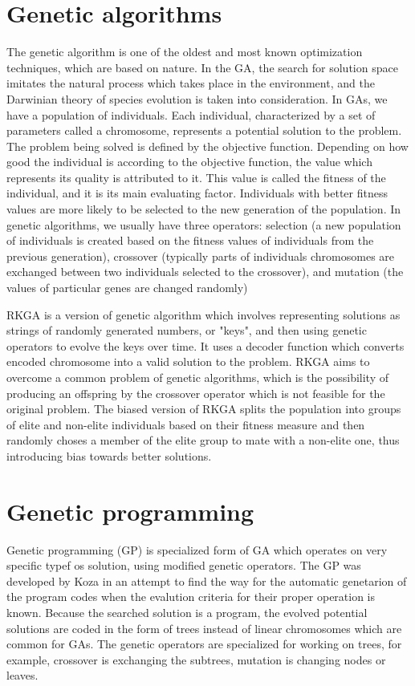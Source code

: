 \documentclass[oneside]{ctuthesis}
\theoremstyle{plain}
\theoremstyle{definition}
\theoremstyle{note}
\begin{document}
\section{Genetic algorithms}
The genetic algorithm is one of the oldest and most known optimization techniques, which are based on nature. In the GA, the search for solution space imitates the natural process which takes place in the environment, and the Darwinian theory of species evolution is taken into consideration. In GAs, we have a population of individuals. Each individual, characterized by a set of parameters called a chromosome, represents a potential solution to the problem. The problem being solved is defined by the objective function. Depending on how good the individual is according to the objective function, the value which represents its quality is attributed to it. This value is called the fitness of the individual, and it is its main evaluating factor. Individuals with better fitness values are more likely to be selected to the new generation of the population. In genetic algorithms, we usually have three operators: selection (a new population of individuals is created based on the fitness values of individuals from the previous generation), crossover (typically parts of individuals chromosomes are exchanged between two individuals selected to the crossover), and mutation (the values of particular genes are changed randomly)

RKGA is a version of genetic algorithm which involves representing solutions as strings of randomly generated numbers, or "keys", and then using genetic operators to evolve the keys over time. It uses a decoder function which converts encoded chromosome into a valid solution to the problem. RKGA aims to overcome a common problem of genetic algorithms, which is the possibility of producing an offspring by the crossover operator which is not feasible for the original problem. The biased version of RKGA splits the population into groups of elite and non-elite individuals based on their fitness measure and then randomly choses a member of the elite group to mate with a non-elite one, thus introducing bias towards better solutions.

\section{Genetic programming}
Genetic programming (GP) is specialized form of GA which operates on very specific typef os solution, using modified genetic operators. The GP was developed by Koza \cite{koza1992genetic} in an attempt to find the way for the automatic genetarion of the program codes when the evalution criteria for their proper operation is known. Because the searched solution is a program, the evolved potential solutions are coded in the form of trees instead of linear chromosomes which are common for GAs. The genetic operators are specialized for working on trees, for example, crossover is exchanging the subtrees, mutation is changing nodes or leaves.
\end{document}
